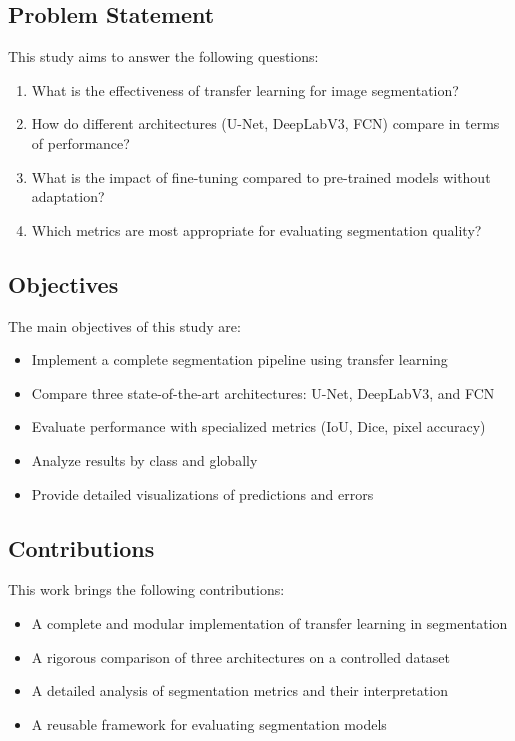 \documentclass[12pt,a4paper]{article}
\begin{document}
\subsection{Problem Statement}

This study aims to answer the following questions:
\begin{enumerate}
    \item What is the effectiveness of transfer learning for image segmentation?
    \item How do different architectures (U-Net, DeepLabV3, FCN) compare in terms of performance?
    \item What is the impact of fine-tuning compared to pre-trained models without adaptation?
    \item Which metrics are most appropriate for evaluating segmentation quality?
\end{enumerate}

\subsection{Objectives}

The main objectives of this study are:
\begin{itemize}
    \item Implement a complete segmentation pipeline using transfer learning
    \item Compare three state-of-the-art architectures: U-Net, DeepLabV3, and FCN
    \item Evaluate performance with specialized metrics (IoU, Dice, pixel accuracy)
    \item Analyze results by class and globally
    \item Provide detailed visualizations of predictions and errors
\end{itemize}

\subsection{Contributions}

This work brings the following contributions:
\begin{itemize}
    \item A complete and modular implementation of transfer learning in segmentation
    \item A rigorous comparison of three architectures on a controlled dataset
    \item A detailed analysis of segmentation metrics and their interpretation
    \item A reusable framework for evaluating segmentation models
\end{itemize}
\end{document}
